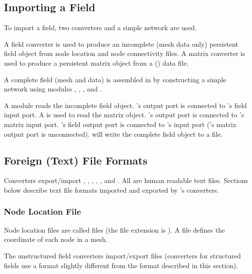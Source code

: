 \subsection{Importing a Field}
\label{sec:import_field}

To import a field, two converters and a simple \sr{} network are used.

A field converter is used to produce an incomplete (mesh data only)
persistent field object from node location and node connectivity
files.  A matrix converter is used to produce a persistent matrix
object from a () data file.

A complete field (mesh and data) is assembled in \sr{} by
constructing a simple network using modules ,
,  , and
.

A  module reads the incomplete field object.
's output port is connected to
's field input port.  A
 is used to read the matrix object.
's output port is connected to
's matrix input port.
's field output port is connected to
's input port ('s
matrix output port is unconnected).   will write
the complete field object to a file.

\subsection{Foreign (Text) File Formats}

Converters export/import , , , , ,  and .
All are human readable text files.  Sections below describe text file
formats imported and exported by \sr{}'s converters.

\subsubsection{Node Location File}
\label{sec:node_loc_fmt}

Node location files are called  files (the file extension is
).  A  file defines the coordinate of
each node in a mesh.

The unstructured field converters import/export  files
(converters for structured fields use a  format slightly
different from the format described in this section).

